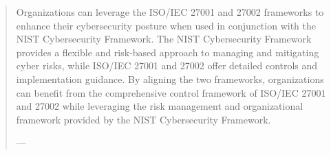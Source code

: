 \begin{formal}

     \begin{quote}
     
               Organizations can leverage the ISO/IEC 27001 and 27002 frameworks to enhance their cybersecurity posture when used in conjunction with the NIST Cybersecurity Framework. The NIST Cybersecurity Framework provides a flexible and risk-based approach to managing and mitigating cyber risks, while ISO/IEC 27001 and 27002 offer detailed controls and implementation guidance. By aligning the two frameworks, organizations can benefit from the comprehensive control framework of ISO/IEC 27001 and 27002 while leveraging the risk management and organizational framework provided by the NIST Cybersecurity Framework.
               
               \begin{flushright}
                         ---\cite{boyle2023}
               \end{flushright}
               
     \end{quote}
     
\end{formal}
          
          
